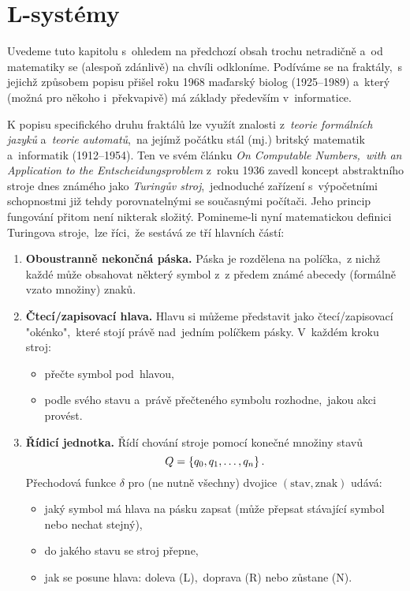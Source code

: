 \section{L-systémy}\label{sec:L-systemy}

Uvedeme tuto kapitolu s~ohledem na předchozí obsah trochu netradičně a~od matematiky se (alespoň zdánlivě) na chvíli odkloníme. Podíváme se na fraktály,~s jejichž způsobem popisu přišel roku 1968 maďarský biolog  (1925--1989) a~který (možná pro někoho i~překvapivě) má základy především v~informatice. \citep[str. 2]{Prusinkiewicz1990}

K popisu specifického druhu fraktálů lze využít znalosti z~\emph{teorie formálních jazyků} a~\emph{teorie automatů},~na jejímž počátku stál (mj.) britský matematik a~informatik  (1912--1954). Ten ve svém článku \emph{On Computable Numbers,~with an Application to the Entscheidungsproblem} z~roku 1936 zavedl koncept abstraktního stroje dnes známého jako \emph{Turingův stroj},~jednoduché zařízení s~výpočetními schopnostmi již tehdy porovnatelnými se současnými počítači. Jeho princip fungování přitom není nikterak složitý. Pomineme-li nyní matematickou definici Turingova stroje,~lze říci,~že sestává ze tří hlavních částí:
\begin{enumerate}
    \item \textbf{Oboustranně nekončná páska.} Páska je rozdělena na políčka,~z nichž každé může obsahovat některý symbol z~z předem známé abecedy (formálně vzato množiny) znaků.
    \item \textbf{Čtecí/zapisovací hlava.} Hlavu si můžeme představit jako čtecí/zapisovací "okénko",~které stojí právě nad~jedním políčkem pásky. V~každém kroku stroj:
    \begin{itemize}
        \item přečte symbol pod~hlavou,
        \item podle svého stavu a~právě přečteného symbolu rozhodne,~jakou akci provést.
    \end{itemize}
    \item \textbf{Řídicí jednotka.} Řídí chování stroje pomocí konečné množiny stavů
    \[Q=\left\{q_0,q_1,\ldots,q_n\right\}.\]
    Přechodová funkce $\delta$ pro (ne nutně všechny) dvojice $(\text{stav},\text{znak})$ udává:
    \begin{itemize}
        \item jaký symbol má hlava na pásku zapsat (může přepsat stávající symbol nebo nechat stejný),
        \item do jakého stavu se stroj přepne,
        \item jak se posune hlava: doleva (L),~doprava (R) nebo zůstane (N).
    \end{itemize}    
\end{enumerate}
